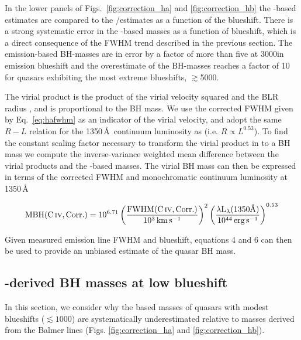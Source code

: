 In the lower panels of Figs.~\ref{fig:correction_ha} and \ref{fig:correction_hb} the -based estimates are compared to the \hans/\hb estimates as a function of the  blueshift. 
There is a strong systematic error in the -based masses as a function of blueshift, which is a direct consequence of the FWHM trend described in the previous section. 
The  emission-based BH-masses are in error by a factor of more than five at 3000\kms in  emission blueshift and the overestimate of the BH-masses reaches a factor of 10 for quasars exhibiting the most extreme blueshifts, $\gtrsim$5000\kms. 

The virial product is the product of the virial velocity squared and the BLR radius \citep[e.g.][]{shen13}, and is proportional to the BH mass. 
We use the corrected  FWHM given by Eq.~\ref{eq:hafwhm} as an indicator of the virial velocity, and adopt the same $R-L$ relation for the 1350\,\AA\, continuum luminosity as \citet{vestergaard06} (i.e. $R \propto L^{0.53}$). 
To find the constant scaling factor necessary to transform the virial product in to a BH mass we compute the inverse-variance weighted mean difference between the virial products and the \hans-based masses. 
The virial BH mass can then be expressed in terms of the corrected  FWHM and monochromatic continuum luminosity at 1350\,\AA

\begin{equation}
  \label{eq:masscorrection}
  \mathrm{MBH}(\mathrm{C}\,\textsc{iv}, \mathrm{Corr.}) = 10^{6.71}\left( \frac{ \mathrm{FWHM}(\mathrm{C}\,\textsc{iv}, \mathrm{Corr.})}{10^3 \mathrm{\,km\,s^{-1}}} \right)^2 \left( \frac{\lambda \mathrm{L}_{\lambda} (1350 \text{\AA}) }{10^{44} \mathrm{\,erg\,s^{-1}}}  \right)^{0.53}
\end{equation}

Given measured  emission line FWHM and blueshift, equations 4 and 6 can then be used to provide an unbiased estimate of the quasar BH mass.

\subsection{-derived BH masses at low  blueshift}

In this section, we consider why the  based masses of quasars with modest  blueshifts ($\lesssim1000$\kms) are systematically underestimated relative to masses derived from the Balmer lines (Figs. \ref{fig:correction_ha} and \ref{fig:correction_hb}). 

